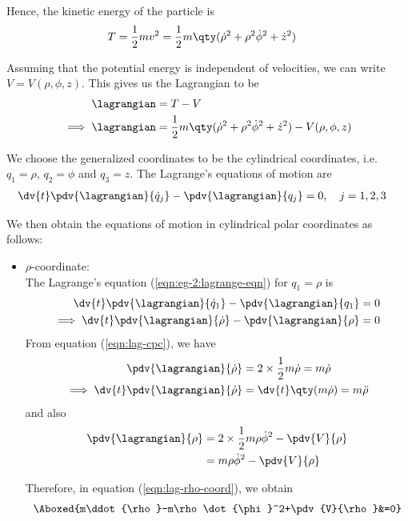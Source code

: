 \begin{enumerate}
	Hence, the kinetic energy of the particle is
	\begin{align*}
		T&=\dfrac{1}{2}mv^2=\dfrac{1}{2}m\qty(\dot{\rho}^2+\rho^2\dot{\phi}^2+\dot{z}^2)
	\end{align*}
	
	Assuming that the potential energy is independent of velocities, we can write $V=V(\rho,\phi,z)$. This gives us the Lagrangian to be
	\begin{align}
		\lagrangian&=T-V \nonumber\\
		\implies\lagrangian&=\dfrac{1}{2}m\qty(\dot{\rho}^2+\rho^2\dot{\phi}^2+\dot{z}^2)-V(\rho,\phi,z) \label{eqn:lag-cpc}
	\end{align}
	
	We choose the generalized coordinates to be the cylindrical coordinates, i.e. $q_1=\rho$, $q_2=\phi$ and $q_3=z$. The Lagrange's equations of motion are
	\begin{align}
		\dv{t}\pdv{\lagrangian}{\dot{q}_j}-\pdv{\lagrangian}{q_j}&=0,\quad j=1,2,3\label{eqn:eg-2:lagrange-eqn}
	\end{align}
	
	We then obtain the equations of motion in cylindrical polar coordinates as follows:
	\begin{itemize}
		\item $\rho$-coordinate:\\
		The Lagrange's equation (\ref{eqn:eg-2:lagrange-eqn}) for $q_1=\rho$ is
		\begin{align}
			\dv{t}\pdv{\lagrangian}{\dot{q}_1}-\pdv{\lagrangian}{q_1}&=0 \nonumber\\
			\implies\dv{t}\pdv{\lagrangian}{\dot{\rho}}-\pdv{\lagrangian}{\rho}&=0 \label{eqn:lag-rho-coord}
		\end{align}
		From equation (\ref{eqn:lag-cpc}), we have
		\begin{align*}
			\pdv{\lagrangian}{\dot{\rho}}&=2\times\dfrac{1}{2}m\dot{\rho}=m\dot{\rho} \\
			\implies\dv{t}\pdv{\lagrangian}{\dot{\rho}}&=\dv{t}\qty(m\dot{\rho})=m\ddot{\rho}
		\end{align*}
		and also
		\begin{align*}
			\pdv{\lagrangian}{\rho}&=2\times\dfrac{1}{2}m\rho\dot{\phi}^2-\pdv{V}{\rho} \\
			&=m\rho\dot{\phi}^2-\pdv{V}{\rho}
		\end{align*}
		
		Therefore, in equation (\ref{eqn:lag-rho-coord}), we obtain
		\begin{align*}
			\Aboxed{m\ddot{\rho}-m\rho\dot{\phi}^2+\pdv{V}{\rho}&=0}
		\end{align*}
		

\end{itemize}
\end{enumerate}
